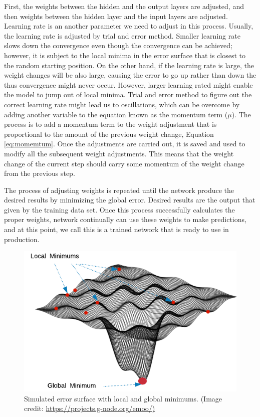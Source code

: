 First, the weights between the hidden and the output layers are adjusted, and then weights between the hidden layer and the input layers are adjusted. Learning rate is an another parameter we need to adjust in this process. Usually, the learning rate is adjusted by trial and error method. Smaller learning rate slows down the convergence even though the convergence can be achieved; however, it is subject to the local minima in the error surface that is closest to the random starting position. On the other hand, if the learning rate is large, the weight changes will be also large, causing the error to go up rather than down the thus convergence might never occur. However, larger learning rated might enable the model to jump out of local minima. Trial and error method to figure out the correct learning rate might lead us to oscillations, which can be overcome by adding another variable to the equation known as the momentum term ($\mu$). The process is to add a momentum term to the weight adjustment that is proportional to the amount of the previous weight change, Equation \ref{eq:momemtum}. Once the adjustments are carried out, it is saved and used to modify all the subsequent weight adjustments. This means that the weight change of the current step should carry some momentum of the weight change from the previous step. 

The process of adjusting weights is repeated until the network produce the desired results by minimizing the global error. Desired results are the output that given by the training data set. Once this process successfully calculates the proper weights, network continually can use these weights to make predictions, and at this point, we call this is a trained network that is ready to use in production. 

\begin{figure}[!h]
\begin{center}
        \includegraphics[width=0.4\textheight]{img/globalmin.png}
        \caption{Simulated error surface with local and global minimums. (Image credit: \url{https://projects.g-node.org/emoo/)}}  \label{fig:globalmin}
\end{center}
\end{figure}


